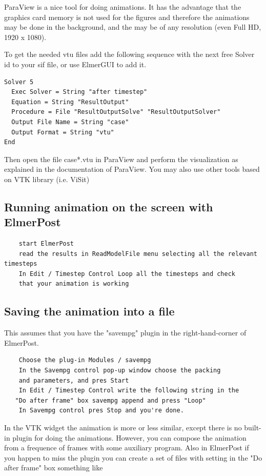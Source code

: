 ParaView is a nice tool for doing animations. It has the advantage that the graphics card memory is not used for the figures and therefore the animations may be done in the background, and the may be of any resolution (even Full HD, 1920 x 1080).

To get the needed vtu files add the following sequence with the next free Solver id to your sif file, or use ElmerGUI to add it.

\begin{verbatim}
Solver 5 
  Exec Solver = String "after timestep"	
  Equation = String "ResultOutput"
  Procedure = File "ResultOutputSolve" "ResultOutputSolver"
  Output File Name = String "case" 
  Output Format = String "vtu"
End
\end{verbatim}

Then open the file case*.vtu in ParaView and perform the visualization as explained in the documentation of ParaView. You may also use other tools based on VTK library (i.e. ViSit)

\subsection{Running animation on the screen with ElmerPost}

\begin{verbatim}
    start ElmerPost
    read the results in ReadModelFile menu selecting all the relevant timesteps
    In Edit / Timestep Control Loop all the timesteps and check
    that your animation is working 
\end{verbatim}

\subsection{Saving the animation into a file}

This assumes that you have the "savempg" plugin in the right-hand-corner of ElmerPost.

\begin{verbatim}
    Choose the plug-in Modules / savempg
    In the Savempg control pop-up window choose the packing
    and parameters, and pres Start
    In Edit / Timestep Control write the following string in the
   "Do after frame" box savempg append and press "Loop"
    In Savempg control pres Stop and you're done. 
\end{verbatim}

In the VTK widget the animation is more or less similar, except there is no built-in plugin for doing the animations. However, you can compose the animation from a frequence of frames with some auxiliary program. Also in ElmerPost if you happen to miss the plugin you can create a set of files with setting in the "Do after frame" box something like


